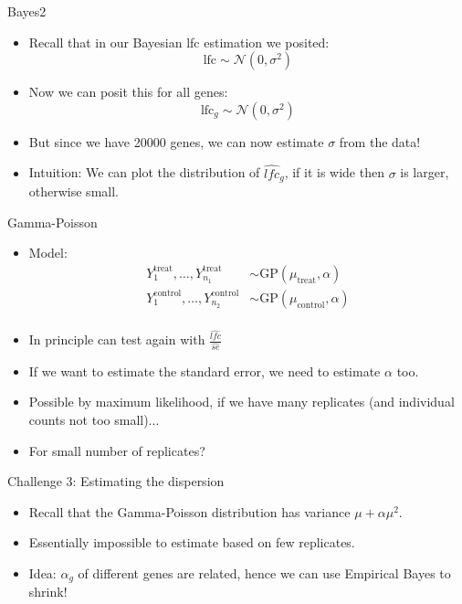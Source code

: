\documentclass[red,xcolor={table,usenames,dvipsnames}]{beamer}
\begin{document}
\begin{frame}{Bayes2}
\begin{itemize}
\item Recall that in our Bayesian lfc estimation we posited:
  $$\text{lfc} \sim \mathcal{N}\left(0,\sigma^2\right)$$
\item Now we can posit this for all genes:
  $$\text{lfc}_g \sim \mathcal{N}\left(0,\sigma^2\right)$$
\item But since we have 20000 genes, we can now estimate $\sigma$ from the data!
\item Intuition: We can plot the distribution of $\widehat{lfc}_g$, if it is wide then $\sigma$ is larger, otherwise small.
\end{itemize}
\end{frame}

\begin{frame}{Gamma-Poisson}
  \begin{itemize}
  \item Model:
  \begin{equation*}
\begin{aligned}
Y^{\text{treat}}_{1},\dotsc, Y^{\text{treat}}_{n_1} &\sim \text{GP}(\mu_{\text{treat}}, \alpha)\\
Y^{\text{control}}_{1},\dotsc, Y^{\text{control}}_{n_2} &\sim \text{GP}(\mu_{\text{control}}, \alpha)\\
\end{aligned}
\end{equation*}
  \item In principle can test again with $\frac{\widehat{lfc}}{\widehat{se}}$
  \item If we want to estimate the standard error, we need to estimate $\alpha$ too.
  \item Possible by maximum likelihood, if we have many replicates (and individual counts not too small)...
  \item For small number of replicates?
\end{itemize}
\end{frame}

\begin{frame}{Challenge 3: Estimating the dispersion}
\begin{itemize}
  \item Recall that the Gamma-Poisson distribution has variance $\mu + \alpha \mu^2$.
  \item Essentially impossible to estimate based on few replicates.
  \item Idea: $\alpha_g$ of different genes are related, hence we can use Empirical Bayes to shrink!
\end{itemize}
\end{frame}
\end{document}
